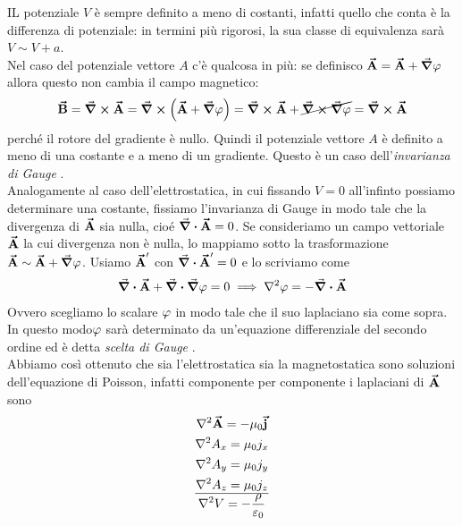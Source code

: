IL potenziale $V$ è sempre definito a meno di costanti, infatti quello che conta è la differenza di potenziale: in termini più rigorosi, la sua classe di equivalenza sarà $V\sim V+a$. \\
Nel caso del potenziale vettore $A$ c'è qualcosa in più: se definisco $\vba A=\vba A+\grad\oldphi$ allora questo non cambia il campo magnetico:
\begin{gather*}
	\vba B=\curl\vba A=\curl \left( \vba A+\grad\oldphi\right)= \curl \vba A + \cancel{\curl\grad\oldphi}=\curl\vba A		
\end{gather*} 
perché il rotore del gradiente è nullo. Quindi il potenziale vettore $A$ è definito a meno di una costante e a meno di un gradiente. Questo è un caso dell'\textit{invarianza di Gauge}  .\\
Analogamente al caso dell'elettrostatica, in cui fissando $V=0$ all'infinto possiamo determinare una costante, fissiamo l'invarianza di Gauge in modo tale che la divergenza di $\vb*{\va{A}}$ sia nulla, cioé $\div \vb*{\va{A}}=0$. 
Se consideriamo un campo vettoriale $\vb*{\va{A}}$ la cui divergenza non è nulla, lo mappiamo sotto la trasformazione $\vb*{\va{A}}\sim \vb*{\va{A}}+\grad\varphi$. Usiamo $\vb*{\va{A}}'$ con $\div \vb*{\va{A}}'=0$ e lo scriviamo come
\begin{gather*}
	\div\vba A+\div\grad\oldphi=0 \implies \laplacian\oldphi= -\div\vba A
\end{gather*}
Ovvero scegliamo lo scalare $\oldphi$ in modo tale che il suo laplaciano sia come sopra. In questo modo$\oldphi$ sarà determinato da un'equazione differenziale del secondo ordine ed è detta \textit{scelta di Gauge} .\\
%

Abbiamo così ottenuto che sia l'elettrostatica sia la magnetostatica sono soluzioni dell'equazione di Poisson, infatti componente per componente i laplaciani di $\vb*{\va{A}}$ sono 
\begin{gather*}
	\laplacian\vba A=-\mu_0\vba j\\
	\laplacian A_x=\mu_0 j_x\\
	\laplacian A_y=\mu_0 j_y\\
	\laplacian A_z=\mu_0 j_z\\
	\hline
	\laplacian V=-\frac{\rho}{\epsilon_0}
\end{gather*}

